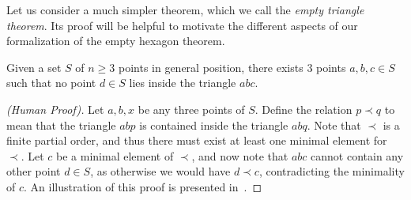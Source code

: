 Let us consider a much simpler theorem, which we call the \emph{empty triangle theorem}. Its proof will be helpful to motivate the different aspects of our formalization of the empty hexagon theorem.

\begin{theorem}
  \label{thm:empty-triangle}
  Given a set $S$ of $n \geq 3$ points in general position, there exists $3$ points $a, b, c \in S$ such that no point $d \in S$ lies inside the triangle $abc$.
\end{theorem}

\begin{proof}[(Human Proof)]
    Let $a, b, x$ be any three points of $S$. 
    Define the relation $p \prec q$ to mean that the triangle $abp$ is contained inside the triangle $abq$. Note that $\prec$ is a finite partial order, and thus there must exist at least one minimal element for $\prec$. 
    Let $c$ be a minimal element of $\prec$, and now note that $abc$ cannot contain any other point $d \in  S$, as otherwise we would have $d \prec c$, contradicting the minimality of $c$. An illustration of this proof is presented in~.
\end{proof}

